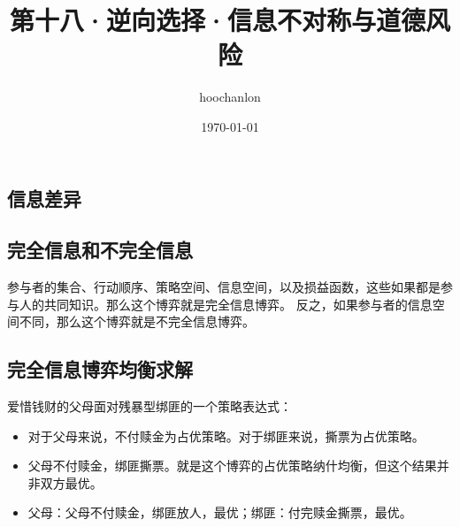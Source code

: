 \documentclass[12pt, a4paper]{article}
\title{第十八·逆向选择·信息不对称与道德风险}
\author{hoochanlon}
\date{\today}
\begin{document}
	\begin{CJK*}{UTF8}{gbsn}
		\maketitle
        \clearpage
        \section{信息差异}

        \subsection{完全信息和不完全信息}
        参与者的集合、行动顺序、策略空间、信息空间，以及损益函数，这些如果都是参与人的共同知识。那么这个博弈就是完全信息博弈。
        反之，如果参与者的信息空间不同，那么这个博弈就是不完全信息博弈。

        \subsection{完全信息博弈均衡求解}
        爱惜钱财的父母面对残暴型绑匪的一个策略表达式：
        \begin{itemize}
            \item 对于父母来说，不付赎金为占优策略。对于绑匪来说，撕票为占优策略。
            \item 父母不付赎金，绑匪撕票。就是这个博弈的占优策略纳什均衡，但这个结果并非双方最优。
            \item 父母：父母不付赎金，绑匪放人，最优；绑匪：付完赎金撕票，最优。
        \end{itemize}

        \begin{figure}[htbp]
            \centering
        \end{figure}


\end{CJK*}
\end{document}
